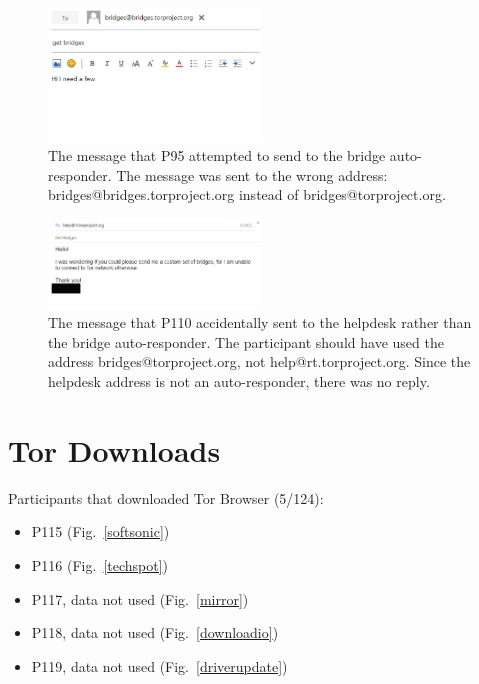 \documentclass[USenglish,oneside,twocolumn]{article}
\begin{document}
\begin{figure}[h]
\includegraphics[width=0.5\textwidth]{../experiment/processing/failed-participants/20160325-140813-bridgeresponder-redacted.png}
\caption{The message that P95 attempted to send to the bridge auto-responder. The message was sent to the wrong address: bridges@bridges.torproject.org instead of bridges@torproject.org.}
\label{autoresponder1}
\end{figure} 

\begin{figure}[h]
\includegraphics[width=0.5\textwidth]{../experiment/processing/failed-participants/20160328-133857-bridgeresponder-redacted.png}
\caption{The message that P110 accidentally sent to the helpdesk rather than the bridge auto-responder. The participant should have used the address bridges@torproject.org, not help@rt.torproject.org. Since the helpdesk address is not an auto-responder, there was no reply.}
\label{autoresponder2}
\end{figure} 

\section{Tor Downloads}
\label{tor-downloads}

Participants that downloaded Tor Browser (5/124): 
\begin{itemize}
\item P115 (Fig.~\ref{softsonic})
\item P116 (Fig.~\ref{techspot})
\item P117, data not used (Fig.~\ref{mirror})
\item P118, data not used (Fig.~\ref{downloadio})
\item P119, data not used (Fig.~\ref{driverupdate})
\end{itemize} 
\end{document}

